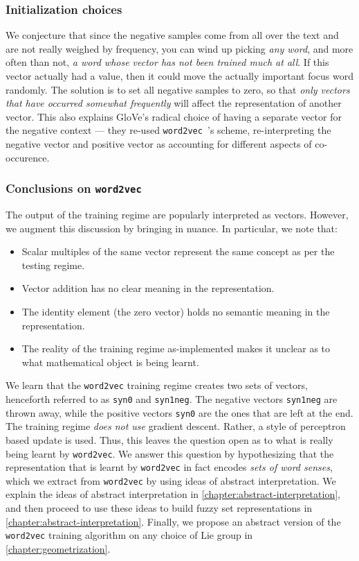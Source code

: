 \documentclass[11pt]{book}
\newcommand{\wtov}{\texttt{word2vec }}
\begin{document}
\subsubsection{Initialization choices}

We conjecture that since the negative samples come from all over the text and
are not really weighed by frequency, you can wind up picking \emph{any word},
and more often than not, \emph{a word whose vector has not been trained much at
all}.  If this vector actually had a value, then it could move the actually
important focus word randomly. The solution is to set all negative samples to
zero, so that \emph{only vectors that have occurred somewhat frequently} will
affect the representation of another vector. This also explains GloVe's radical
choice of having a separate vector for the negative context --- they re-used
\wtov's  scheme, re-interpreting the negative vector and positive vector as
accounting for different aspects of co-occurence.


\subsubsection{Conclusions on \texttt{word2vec}}

The output of the training regime are popularly interpreted as vectors.
However, we augment this discussion by bringing in nuance. In particular, we
note that:
\begin{itemize}
\item Scalar multiples of the same vector represent the same concept as per the testing regime.
\item Vector addition has no clear meaning in the representation.
\item The identity element (the zero vector) holds no semantic meaning in the representation.
\item The reality of the training regime as-implemented makes it unclear as to
      what mathematical object is being learnt.
\end{itemize}


We learn that the \texttt{word2vec} training regime creates two sets of vectors, henceforth
referred to as \texttt{syn0} and \texttt{syn1neg}. The negative vectors
\texttt{syn1neg} are thrown away, while the positive vectors \texttt{syn0} are
the ones that are left at the end. The training regime \emph{does not use}
gradient descent. Rather, a style of perceptron based update is used.  Thus,
this leaves the question open as to what is really being learnt by
\texttt{word2vec}. We answer this question by hypothesizing that the
representation that is learnt by \texttt{word2vec} in fact encodes \emph{sets
of word senses}, which we extract from \texttt{word2vec} by using ideas of
abstract interpretation. We explain the ideas of abstract interpretation in
\autoref{chapter:abstract-interpretation}, and then proceed to use these ideas
to build fuzzy set representations in
\autoref{chapter:abstract-interpretation}. Finally, we propose an abstract
version of the \texttt{word2vec} training algorithm on any choice of Lie group
in \autoref{chapter:geometrization}.
\end{document}
